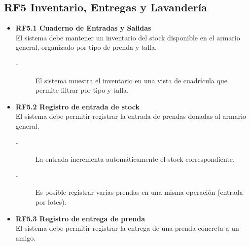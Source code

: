 \subsection{RF5 Inventario, Entregas y Lavandería}
\begin{itemize}
    \item \textbf{RF5.1 Cuaderno de Entradas y Salidas} \\
    El sistema debe mantener un inventario del stock disponible en el
    armario general, organizado por tipo de prenda y talla.
    \begin{description}
        \item[-] El sistema muestra el inventario en una vista de cuadrícula que
        permite filtrar por tipo y talla. 
    \end{description}

    \item \textbf{RF5.2 Registro de entrada de stock} \\
    El sistema debe permitir registrar la entrada de prendas donadas al
    armario general.
    \begin{description}
        \item[-] La entrada incrementa automáticamente el stock correspondiente.
        \item[-] Es posible registrar varias prendas en una misma operación (entrada por lotes). 
    \end{description}

    \item \textbf{RF5.3 Registro de entrega de prenda} \\
    El sistema debe permitir registrar la entrega de una prenda concreta a un amigo.
    

\end{itemize}
